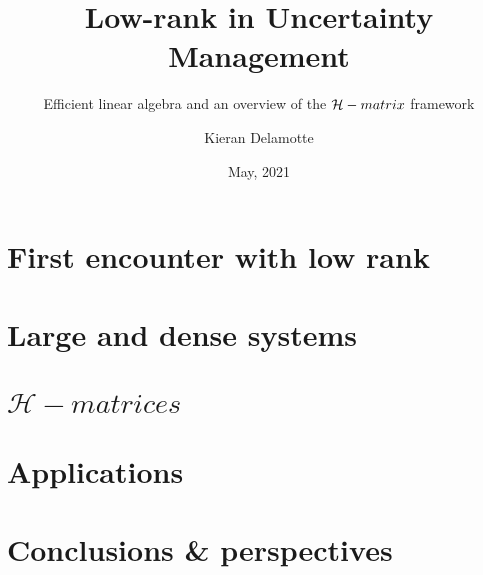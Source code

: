 \documentclass{beamer}
\title{
Low-rank in Uncertainty Management
}
\subtitle{
Efficient linear algebra and an overview of the $\mathcal{H}-matrix  $ framework
}
\author{Kieran Delamotte}
\institute{IMACS}
\date{May, 2021}
\newcommand{\hmats}{\ensuremath{\mathcal{H}}-matrices\xspace}
\begin{document}
\begin{frame}%
\titlepage
\end{frame}


\section*{}
\begin{frame}
\tableofcontents
\end{frame}

\section{First encounter with low rank}


\section{Large and dense systems}


\section{$\hmats$}






\section{Applications}






\section{Conclusions \& perspectives}


\end{document}
